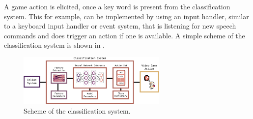 A game action is elicited, once a key word is present from the classification system.
This for example, can be implemented by using an input handler, similar to a keyboard input handler or event system, that is listening for new speech commands and does trigger an action if one is available.
A simple scheme of the classification system is shown in .
\begin{figure}[!ht]
  \centering
  \includegraphics[width=0.65\textwidth]{./6_game/figs/game_system_classification}
  \caption{Scheme of the classification system.}
  \label{fig:game_system_classification}
\end{figure}
\FloatBarrier
\noindent

